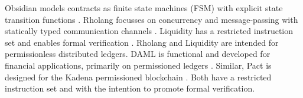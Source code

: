 Obsidian models contracts as finite state machines (FSM) with explicit state transition functions \cite{Coblenz2017}.
Rholang focusses on concurrency and message-passing with statically typed communication channels \cite{Meredith2018}.
Liquidity has a restricted instruction set and enables formal verification \cite{OCamlProSAS2018}.
Rholang and Liquidity are intended for permissionless distributed ledgers.
DAML is functional and developed for financial applications, primarily on permissioned ledgers \cite{Meier2018,Lippmeier2018}.
Similar, Pact is designed for the Kadena permissioned blockchain \cite{Popejoy2017}.
Both have a restricted instruction set and with the intention to promote formal verification.


